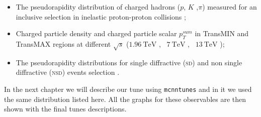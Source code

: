 
\begin{itemize}
	\item The pseudorapidity distribution of charged hadrons ($p$, $K$ ,$\pi$) measured for an
inclusive selection in inelastic proton-proton collisions \cite{CMS:2015zrm}; 
\item Charged particle density and charged particle scalar $p_T^{sum}$ in TransMIN and TransMAX regions at different $\sqrt{s}$ ($1.96\ \mathrm{TeV}$ \cite{CDF:2015txs}, \, $7\ \mathrm{TeV}$ \cite{CMS-PAS-FSQ-12-020}, \, $13\ \mathrm{TeV}$ \cite{CMS-PAS-FSQ-15-007});
\item The pseudorapidity distributions for single diffractive (\textsc{sd}) and non single diffractive (\textsc{nsd}) events selection \cite{CMS:2018nhd}.
\end{itemize}
In the next chapter we will describe our tune using \texttt{mcnntunes} and in it we used the same distribution listed here. All the graphs for these observables are then shown with the final tunes descriptions.

